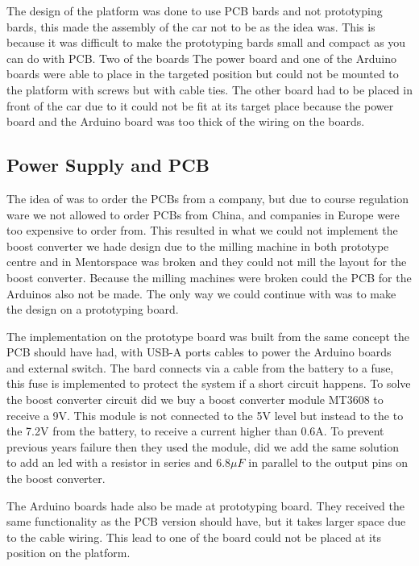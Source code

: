 \documentclass[11pt, titlepage]{article} %
\begin{document}
The design of the platform was done to use PCB bards and not prototyping bards, this made the assembly of the car not to be as the idea was. This is because it was difficult to make the prototyping bards small and compact as you can do with PCB.  Two of the boards The power board and one of the Arduino boards were able to place in the targeted position but could not be mounted to the platform with screws but with cable ties. The other board had to be placed in front of the car due to it could not be fit at its target place because the power board and the Arduino board was too thick of the wiring on the boards. 
 

\subsection{Power Supply and PCB}

The idea of was to order the PCBs from a company, but due to course regulation ware we not allowed to order PCBs from China, and companies in Europe were too expensive to order from. This resulted in what we could not implement the boost converter we hade design due to the milling machine in both prototype centre and in Mentorspace was broken and they could not mill the layout for the boost converter. Because the milling machines were broken could the PCB for the Arduinos also not be made. The only way we could continue with was to make the design on a prototyping board. 

The implementation on the prototype board was built from the same concept the PCB should have had, with USB-A ports cables to power the Arduino boards and external switch. The bard connects via a cable from the battery to a fuse, this fuse is implemented to protect the system if a short circuit happens. To solve the boost converter circuit did we buy a boost converter module MT3608 to receive a 9V. This module is not connected to the 5V level but instead to the to the 7.2V from the battery, to receive a current higher than 0.6A. To prevent previous years failure then they used the module, did we add the same solution to add an led with a resistor in series and $ 6.8\mu F$ in parallel to the output pins on the boost converter.

The Arduino boards hade also be made at prototyping board. They received the same functionality as the PCB version should have, but it takes larger space due to the cable wiring. This lead to one of the board could not be placed at its position on the platform. 
\end{document}
